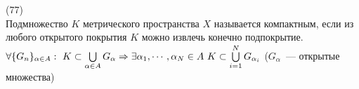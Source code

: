 (77)\\
Подмножество $K$ метрического пространства $X$ называется компактным, если из любого открытого покрытия $K$ можно извлечь конечно подпокрытие.\\
$\forall \{G_n\}_{\alpha \in A}:\ K \subset \bigcup\limits_{\alpha \in A} G_{\alpha} \Rightarrow \exists \alpha_1, \cdots, \alpha_N \in A\ K \subset \bigcup\limits^N_{i = 1} G_{\alpha_i}$ ($G_{\alpha}$~--- открытые множества)